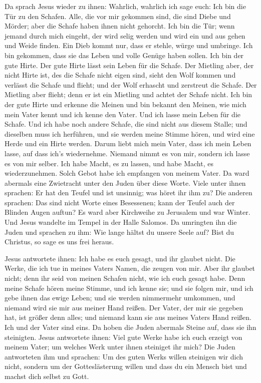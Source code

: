  Da sprach Jesus wieder zu ihnen: Wahrlich, wahrlich ich
sage euch: Ich bin die Tür zu den Schafen.  Alle, die vor
mir gekommen sind, die sind Diebe und Mörder; aber die Schafe haben
ihnen nicht gehorcht.  Ich bin die Tür; wenn jemand durch
mich eingeht, der wird selig werden und wird ein und aus gehen und Weide
finden.  Ein Dieb kommt nur, dass er stehle, würge und
umbringe. Ich bin gekommen, dass sie das Leben und volle Genüge haben
sollen.  Ich bin der gute Hirte. Der gute Hirte lässt
sein Leben für die Schafe.  Der Mietling aber, der nicht
Hirte ist, des die Schafe nicht eigen sind, sieht den Wolf kommen und
verlässt die Schafe und flieht; und der Wolf erhascht und zerstreut die
Schafe.  Der Mietling aber flieht; denn er ist ein
Mietling und achtet der Schafe nicht.  Ich bin der gute
Hirte und erkenne die Meinen und bin bekannt den Meinen, 
wie mich mein Vater kennt und ich kenne den Vater. Und ich lasse mein
Leben für die Schafe.  Und ich habe noch andere Schafe,
die sind nicht aus diesem Stalle; und dieselben muss ich herführen, und
sie werden meine Stimme hören, und wird eine Herde und ein Hirte werden.
 Darum liebt mich mein Vater, dass ich mein Leben lasse,
auf dass ich's wiedernehme.  Niemand nimmt es von mir,
sondern ich lasse es von mir selber. Ich habe Macht, es zu lassen, und
habe Macht, es wiederzunehmen. Solch Gebot habe ich empfangen von meinem
Vater.  Da ward abermals eine Zwietracht unter den Juden
über diese Worte.  Viele unter ihnen sprachen: Er hat den
Teufel und ist unsinnig; was höret ihr ihm zu?  Die
anderen sprachen: Das sind nicht Worte eines Besessenen; kann der Teufel
auch der Blinden Augen auftun?  Es ward aber Kirchweihe
zu Jerusalem und war Winter.  Und Jesus wandelte im
Tempel in der Halle Salomos.  Da umringten ihn die Juden
und sprachen zu ihm: Wie lange hältst du unsere Seele auf? Bist du
Christus, so sage es uns frei heraus.

 Jesus antwortete ihnen: Ich habe es euch gesagt, und ihr
glaubet nicht. Die Werke, die ich tue in meines Vaters Namen, die zeugen
von mir.  Aber ihr glaubet nicht; denn ihr seid von
meinen Schafen nicht, wie ich euch gesagt habe.  Denn
meine Schafe hören meine Stimme, und ich kenne sie; und sie folgen mir,
 und ich gebe ihnen das ewige Leben; und sie werden
nimmermehr umkommen, und niemand wird sie mir aus meiner Hand reißen.
 Der Vater, der mir sie gegeben hat, ist größer denn
alles; und niemand kann sie aus meines Vaters Hand reißen.
 Ich und der Vater sind eins.  Da hoben
die Juden abermals Steine auf, dass sie ihn steinigten. 
Jesus antwortete ihnen: Viel gute Werke habe ich euch erzeigt von meinem
Vater; um welches Werk unter ihnen steiniget ihr mich? 
Die Juden antworteten ihm und sprachen: Um des guten Werks willen
steinigen wir dich nicht, sondern um der Gotteslästerung willen und dass
du ein Mensch bist und machst dich selbst zu Gott.

